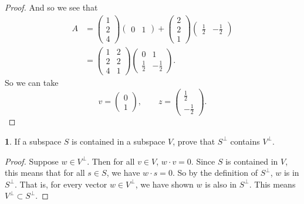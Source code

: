 \documentclass{article}
\theoremstyle{definition}
\newtheorem{prob}{}
\begin{document}
\begin{proof}
	And so we see that 
	\begin{align*}
		A &= \begin{pmatrix} 1 \\ 2 \\ 4 \end{pmatrix} \begin{pmatrix} 0 & 1 \end{pmatrix} + \begin{pmatrix} 2 \\ 2 \\ 1 \end{pmatrix} \begin{pmatrix} \frac{1}{2} & -\frac{1}{2} \end{pmatrix} \\
		&= \begin{pmatrix} 1 & 2 \\ 2 & 2 \\ 4 & 1 \end{pmatrix}\begin{pmatrix} 0 & 1 \\ \frac{1}{2} & -\frac{1}{2}\end{pmatrix}.
	\end{align*}
	So we can take
	\[v = \begin{pmatrix} 0 \\ 1 \end{pmatrix}, \qquad z = \begin{pmatrix} \frac{1}{2} \\ -\frac{1}{2}\end{pmatrix}. \]
\end{proof}


\begin{prob} If a subspace $S$ is contained in a subspace $V$, prove that $S^\perp$ contains $V^\perp$.
\end{prob}

\begin{proof}
	Suppose $w \in V^\perp$. Then for all $v \in V$, $w \cdot v=0$. Since $S$ is contained in $V$, this means that for all $s \in S$, we have $w \cdot s=0$. So by the definition of $S^\perp$, $w$ is in $S^\perp$. That is, for every vector $w \in V^\perp$, we have shown $w$ is also in $S^\perp$. This means $V^\perp \subset S^\perp$.
\end{proof}
\end{document}
